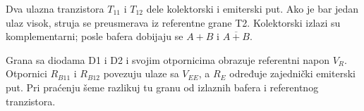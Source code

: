 Dva ulazna tranzistora $T_{11}$ i $T_{12}$ dele kolektorski i emiterski put. Ako je bar jedan ulaz visok, struja se preusmerava iz referentne grane T2. Kolektorski izlazi su komplementarni; posle bafera dobijaju se $A+B$ i $\overline{A+B}$.

Grana sa diodama D1 i D2 i svojim otpornicima obrazuje referentni napon $V_R$. Otpornici $R_{B11}$ i $R_{B12}$ povezuju ulaze sa $V_{EE}$, a $R_E$ određuje zajednički emiterski put. Pri praćenju šeme razlikuj tu granu od izlaznih bafera i referentnog tranzistora.
